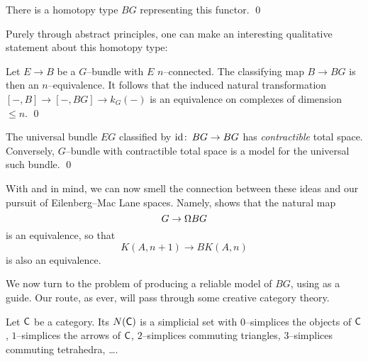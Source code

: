 \begin{corollary}
There is a homotopy type $BG$ representing this functor. \qed
\end{corollary}

\noindent
Purely through abstract principles, one can make an interesting qualitative statement about this homotopy type:

\begin{lemma}
Let $E \to B$ be a $G$--bundle with $E$ $n$--connected.
The classifying map $B \to BG$ is then an $n$--equivalence.
It follows that the induced natural transformation $[-, B] \to [-, BG] \to k_G(-)$ is an equivalence on complexes of dimension $\le n$.
\qed
\end{lemma}

\begin{corollary}\label{CharacterizationOfBG}
The universal bundle $EG$ classified by $\operatorname{id}\colon\thinspace BG \to BG$ has \emph{contractible} total space.
Conversely, $G$--bundle with contractible total space is a model for the universal such bundle.
\qed
\end{corollary}

\begin{remark}
With  and  in mind, we can now smell the connection between these ideas and our pursuit of Eilenberg--Mac Lane spaces.
Namely,  shows that the natural map \[G \to \Omega BG\] is an equivalence, so that \[K(A, n+1) \to BK(A, n)\] is also an equivalence.%
\end{remark}

We now turn to the problem of producing a reliable model of $BG$, using  as a guide.
Our route, as ever, will pass through some creative category theory.

\begin{definition}
Let $\mathsf{C}$ be a category.
Its  $N(\mathsf{C})$ is a simplicial set with $0$--simplices the objects of $\mathsf{C}$, $1$--simplices the arrows of $\mathsf{C}$, $2$--simplices commuting triangles, $3$--simplices commuting tetrahedra, \ldots .
\end{definition}

